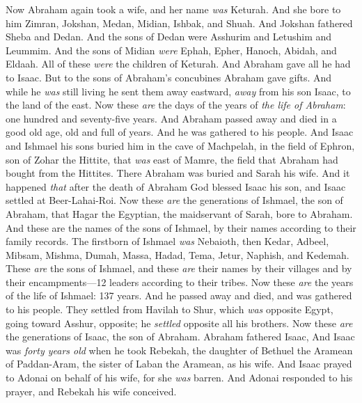 \begin{biblechapter} %
 Now Abraham again took a wife, and her name \textit{was} Keturah.
\verse And she bore to him Zimran, Jokshan, Medan, Midian, Ishbak, and Shuah.
\verse And Jokshan fathered Sheba and Dedan. And the sons of Dedan were Asshurim and Letushim and Leummim.
\verse And the sons of Midian \textit{were} Ephah, Epher, Hanoch, Abidah, and Eldaah. All of these \textit{were} the children of Keturah.
\verse And Abraham gave all he had to Isaac.
\verse But to the sons of Abraham’s concubines Abraham gave gifts. And while he \textit{was} still living he sent them away eastward, \textit{away} from his son Isaac, to the land of the east.
\verse Now these \textit{are} the days of the years of \textit{the life of Abraham}: one hundred and seventy-five years.
\verse And Abraham passed away and died in a good old age, old and full of years. And he was gathered to his people.
\verse And Isaac and Ishmael his sons buried him in the cave of Machpelah, in the field of Ephron, son of Zohar the Hittite, that \textit{was} east of Mamre,
\verse the field that Abraham had bought from the Hittites. There Abraham was buried and Sarah his wife.
\verse And it happened \textit{that} after the death of Abraham God blessed Isaac his son, and Isaac settled at Beer-Lahai-Roi.
\verse Now these \textit{are} the generations of Ishmael, the son of Abraham, that Hagar the Egyptian, the maidservant of Sarah, bore to Abraham.
\verse And these are the names of the sons of Ishmael, by their names according to their family records. The firstborn of Ishmael \textit{was} Nebaioth, then Kedar, Adbeel, Mibsam,
\verse Mishma, Dumah, Massa,
\verse Hadad, Tema, Jetur, Naphish, and Kedemah.
\verse These \textit{are} the sons of Ishmael, and these \textit{are} their names by their villages and by their encampments—12 leaders according to their tribes.
\verse Now these \textit{are} the years of the life of Ishmael: 137 years. And he passed away and died, and was gathered to his people.
\verse They settled from Havilah to Shur, which \textit{was} opposite Egypt, going toward Asshur, opposite; he \textit{settled} opposite all his brothers.
 Now these \textit{are} the generations of Isaac, the son of Abraham. Abraham fathered Isaac,
\verse And Isaac was \textit{forty years old} when he took Rebekah, the daughter of Bethuel the Aramean of Paddan-Aram, the sister of Laban the Aramean, as his wife.
\verse And Isaac prayed to Adonai on behalf of his wife, for she \textit{was} barren. And Adonai responded to his prayer, and Rebekah his wife conceived.

\end{biblechapter}
